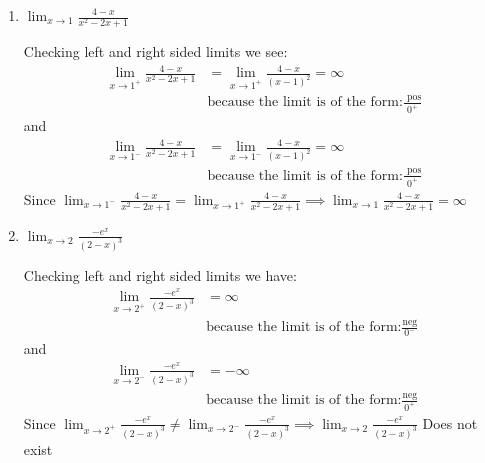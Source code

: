 \documentclass[nooutcomes]{ximera}
\begin{document}
\begin{problem}
\begin{enumerate}
    \item
      $\displaystyle \lim_{x \to 1} \frac{4-x}{x^2 - 2x + 1}$
      \begin{freeResponse}
        Checking left and right sided limits we see:
        \begin{align*}
          \lim_{x \to 1^+} \frac{4-x}{x^2 - 2x + 1} &= \lim_{x \to 1^+}\frac{4-x}{(x-1)^2} = \infty\\
	&\text{because the limit is of the form:} \frac{\text{ pos}}{0^+}
        \end{align*}
 	 and
        \begin{align*}
 	\lim_{x \to 1^-} \frac{4-x}{x^2 - 2x + 1} &= \lim_{x \to 1^-}\frac{4-x}{(x-1)^2} = \infty\\
	&\text{because the limit is of the form:} \frac{\text{ pos}}{0^+}
	\end{align*}
	Since $\lim_{x \to 1^-} \frac{4-x}{x^2 - 2x + 1}=\lim_{x \to 1^+} \frac{4-x}{x^2 - 2x + 1} \implies  \lim_{x \to 1} \frac{4-x}{x^2 - 2x + 1} = \infty$
      \end{freeResponse}

    \item
      $\displaystyle \lim_{x \to 2} \frac{-e^x}{(2-x)^3}$
      \begin{freeResponse}
        Checking left and right sided limits we have:
 \begin{align*}
          \lim_{x \to 2^+} \frac{-e^x}{(2-x)^3} &= \infty\\
	&\text{because the limit is of the form:} \frac{\text{neg}}{0^-}
        \end{align*}
 	 and
        \begin{align*}
 	\lim_{x \to 2^-} \frac{-e^x}{(2-x)^3} &= - \infty\\
	&\text{because the limit is of the form:} \frac{\text{neg}}{0^+}
	\end{align*}
	Since $ \lim_{x \to 2^+} \frac{-e^x}{(2-x)^3} \ne \lim_{x \to 2^-} \frac{-e^x}{(2-x)^3} \implies   \lim_{x \to 2} \frac{-e^x}{(2-x)^3}$ Does not exist
      \end{freeResponse}
\end{enumerate}
\end{problem}
\end{document}
